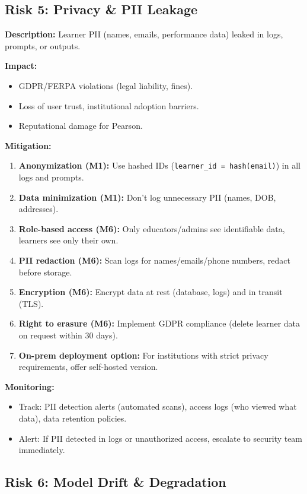 \documentclass[11pt,letterpaper]{article}
\begin{document}
\subsection{Risk 5: Privacy \& PII Leakage}\label{subsec:risk-5-privacy}

\textbf{Description:} Learner PII (names, emails, performance data) leaked in logs, prompts, or outputs.

\textbf{Impact:}
\begin{itemize}
\item GDPR/FERPA violations (legal liability, fines).
\item Loss of user trust, institutional adoption barriers.
\item Reputational damage for Pearson.
\end{itemize}

\textbf{Mitigation:}
\begin{enumerate}
\item \textbf{Anonymization (M1):} Use hashed IDs (\texttt{learner\_id = hash(email)}) in all logs and prompts.
\item \textbf{Data minimization (M1):} Don't log unnecessary PII (names, DOB, addresses).
\item \textbf{Role-based access (M6):} Only educators/admins see identifiable data, learners see only their own.
\item \textbf{PII redaction (M6):} Scan logs for names/emails/phone numbers, redact before storage.
\item \textbf{Encryption (M6):} Encrypt data at rest (database, logs) and in transit (TLS).
\item \textbf{Right to erasure (M6):} Implement GDPR compliance (delete learner data on request within 30 days).
\item \textbf{On-prem deployment option:} For institutions with strict privacy requirements, offer self-hosted version.
\end{enumerate}

\textbf{Monitoring:}
\begin{itemize}
\item Track: PII detection alerts (automated scans), access logs (who viewed what data), data retention policies.
\item Alert: If PII detected in logs or unauthorized access, escalate to security team immediately.
\end{itemize}

\subsection{Risk 6: Model Drift \& Degradation}\label{subsec:risk-6-model-drift}
\end{document}
